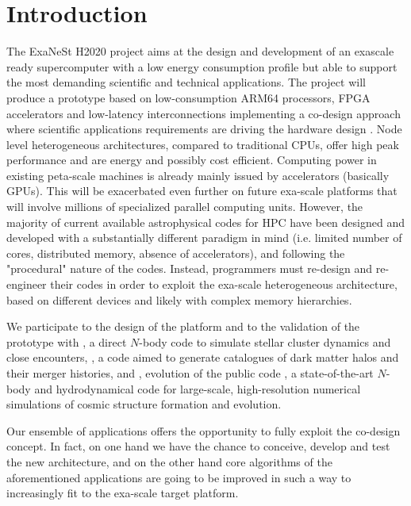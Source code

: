 \documentclass[11pt,twoside]{article}
\begin{document}
\section{Introduction}
The ExaNeSt H2020 \citep{ExaNeSt} project aims at the design and development of an exascale ready supercomputer 
with a low energy consumption profile but able to support the most demanding scientific and technical applications. 
The project will produce a prototype based on low-consumption ARM64 processors, FPGA accelerators and 
low-latency interconnections implementing a co-design approach where scientific applications requirements 
are driving the hardware design \citep{I12-1_adassxxvi}. 
Node level heterogeneous architectures, compared to traditional CPUs, offer high peak performance and 
are energy and possibly cost efficient. Computing power in existing peta-scale machines is already mainly issued by accelerators (basically GPUs). This will be exacerbated even further on future exa-scale platforms 
that will involve millions of specialized parallel computing units.
However, the majority of current available astrophysical codes for HPC have been designed and 
developed with a substantially different paradigm in mind (i.e. limited number of cores, distributed memory, 
absence of accelerators), and following the "procedural" nature of the codes. 
Instead, programmers must re-design and re-engineer their codes in order to exploit the exa-scale heterogeneous architecture, 
based on different devices and likely with complex memory hierarchies.

We participate to the design of the platform and to the validation of the prototype with 
{} \citep{HiGPUs1}, a direct $N$-body code to simulate stellar cluster dynamics and close encounters, 
{} \citep{Monaco_2002}, a code aimed to generate catalogues of dark matter halos and their merger histories, 
and {}, evolution of the public code {} \citep{Springel_2005}, a state-of-the-art $N$-body and hydrodynamical code for large-scale, 
high-resolution numerical simulations of cosmic structure formation and evolution.

Our ensemble of applications offers the opportunity to fully exploit the co-design concept. 
In fact, on one hand we have the chance to conceive, develop and test the new architecture, 
and on the other hand core algorithms of the aforementioned applications are going to be improved in such a way to 
increasingly fit to the exa-scale target platform. 
\end{document}
